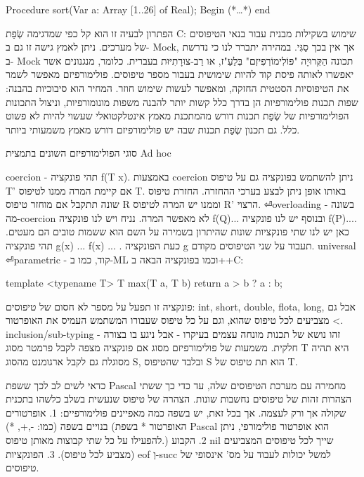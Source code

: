       Procedure sort(Var a: Array [1..26] of Real);
      Begin
      (*…*)
      end

      הפתרון לבעיה זו הוא קל כפי שמדגימה שְׂפַת C: שימוש בשקילות מבנית עבור בנאי הטיפוסים של מערכים. ניתן לאמץ גישה זו גם ב- Mock, אך אין בכך סַגִּי. במהירה יתברר לנו כי נדרשת ב- Mock תכונה הַקְּרוּיָה "פּוֹלִימוֹרְפִיזְם" בְּלַעַ"ז, או רַב-צוּרָתִיּוּת בעברית. כלומר, מנגנונים אשר יאפשרו לאותה פיסת קוד להיות שימושית בעבור מספר טיפוסים. פולימורפיזם מאפשר לשמר את הטיפוסיות הסטטית החזקה, ומאפשר לעשות שימוש חוזר.
      המחיר הוא סיבוכיות בהבנה: שפות תכנות פולימורפיות הן בדרך כלל קשות יותר להבנה משפות מונומורפיות, וניצול התכונות הפולימורפיות של שְׂפַת תכנות דורש מהמתכנת מאמץ אינטלקטואלי שעשוי להיות לא פשוט כלל. גם תכנון שְׂפַת תכנות שבה יש פולימורפיזם דורש מאמץ משמעותי ביותר.

      סוגי הפולימורפיזם השונים בתמצית
      Ad hoc
      \begin{ציינון}
\item coercion - תהי פונקציה f(T x){}. באמצעות coercion ניתן להשתמש בפונקציה גם על טיפוס T' אם קיימת המרה ממנו לטיפוס T. באותו אופן ניתן לבצע בערכי ההחזרה.
      החזרת טיפוס שונה תתקבל אם מוחזר טיפוס R וממנו יש המרה לטיפוס R' הרצוי.
⏎overloading - בשונה מה-coercion לא מאפשר המרה. נניח ויש לנו פונקציה f(Q){...} ובנוסף יש לנו פונקציה f(P){...}. כאן יש לנו שתי פונקציות שונות שהיתרון בשמירה על השם הוא ששמות טובים הם מעטים.
      תהי פונקציה g(x){ ... f(x) ... }. כעת הפונקציה g תעבוד על שני הטיפוסים מקודם.
      universal
⏎parametric - קוד, כמו ב-ML וכמו בפונקציה הבאה ב++C:
    \end{ציינון}

      template <typename T>
      T max(T a, T b) {
        return a > b ? a : b;
      }

      פונקציה זו תפעל על מספר לא חסום של טיפוסים: int, short, double, flota, long, אבל גם מצביעים לכל טיפוס שהוא, וגם על כל טיפוס שעבורו המשתמש העמיס את האופרטור <.
inclusion/sub-typing - זהו נושא של תכנות מונחה עצמים בעיקרו - אבל ניגע בו בצורה חלקית. משמעות של פולימורפיזם מסוג אם פונקציה מצפה לקבל פרמטר מסוג T היא תהיה מסוגלת גם לקבל ארגומנט מהסוג S, ובלבד שהטיפוס S הוא תת טיפוס של T.

      כדאי לשים לב לכך ששפת Pascal מחמירה עם מערכת הטיפוסים שלה, עד כדי כך ששתי הצהרות זהות של טיפוסים נחשבות שונות. הצהרה של טיפוס שנעשית בשלב כלשהו בתכנית שקולה אך ורק לעצמה. אך בכל זאת, יש בשפה כמה מאפיינים פולימורפיים:
      1. אופרטורים בנויים בשפה (כמו: -,+, *) (האופרטור * בשפת Pascal הוא אופרטור פולימורפי, ניתן להפעילו על כל שתי קבוצות מאותן טיפוס.)
      2. הקבוע nil שייך לכל טיפוסים המצביעים (מצביע לכל טיפוס).
      3. הפונקציות eof וְ-succ למשל יכולות לעבוד על מס' אינסופי של טיפוסים.

